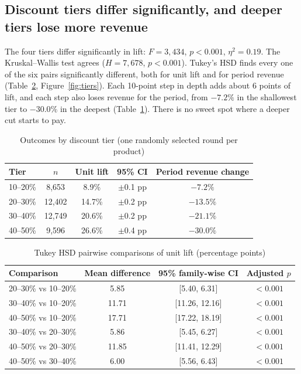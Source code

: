 \documentclass[11pt, a4paper]{article}
\begin{document}
\subsection{Discount tiers differ significantly, and deeper tiers lose more revenue}
The four tiers differ significantly in lift: $F = 3{,}434$, $p < 0.001$, $\eta^2 = 0.19$. The Kruskal--Wallis test agrees ($H = 7{,}678$, $p < 0.001$). Tukey's HSD finds every one of the six pairs significantly different, both for unit lift and for period revenue (Table~\ref{tab:tukey}, Figure~\ref{fig:tiers}). Each 10-point step in depth adds about 6 points of lift, and each step also loses revenue for the period, from $-7.2\%$ in the shallowest tier to $-30.0\%$ in the deepest (Table~\ref{tab:tiers}). There is no sweet spot where a deeper cut starts to pay.

\begin{table}[!htbp]
\centering\small
\caption{Outcomes by discount tier (one randomly selected round per product)}
\label{tab:tiers}
\begin{tabular}{lcccc}
\toprule
\textbf{Tier} & \textbf{$n$} & \textbf{Unit lift} & \textbf{95\% CI} & \textbf{Period revenue change} \\
\midrule
10--20\% & 8,653  & 8.9\%  & $\pm$0.1 pp & $-7.2\%$ \\
20--30\% & 12,402 & 14.7\% & $\pm$0.2 pp & $-13.5\%$ \\
30--40\% & 12,749 & 20.6\% & $\pm$0.2 pp & $-21.1\%$ \\
40--50\% & 9,596  & 26.6\% & $\pm$0.4 pp & $-30.0\%$ \\
\bottomrule
\end{tabular}
\end{table}

\begin{table}[!htbp]
\centering\small
\caption{Tukey HSD pairwise comparisons of unit lift (percentage points)}
\label{tab:tukey}
\begin{tabular}{lccc}
\toprule
\textbf{Comparison} & \textbf{Mean difference} & \textbf{95\% family-wise CI} & \textbf{Adjusted $p$} \\
\midrule
20--30\% vs 10--20\% & 5.85  & [5.40, 6.31]   & $<0.001$ \\
30--40\% vs 10--20\% & 11.71 & [11.26, 12.16] & $<0.001$ \\
40--50\% vs 10--20\% & 17.71 & [17.22, 18.19] & $<0.001$ \\
30--40\% vs 20--30\% & 5.86  & [5.45, 6.27]   & $<0.001$ \\
40--50\% vs 20--30\% & 11.85 & [11.41, 12.29] & $<0.001$ \\
40--50\% vs 30--40\% & 6.00  & [5.56, 6.43]   & $<0.001$ \\
\bottomrule
\end{tabular}
\end{table}
\end{document}

